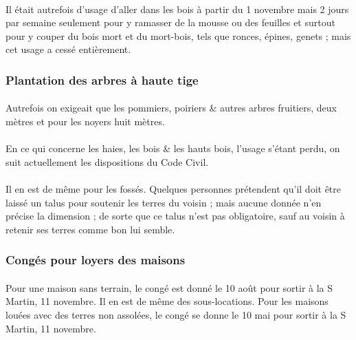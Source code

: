 \documentclass[../eBook.tex]{subfiles}
\begin{document}
      \paragraph{}Il était autrefois d'usage d'aller dans les bois à partir du 1 novembre mais 2 jours par semaine seulement pour y ramasser de la mousse ou des feuilles et surtout pour y couper du bois mort et du mort-bois, tels que ronces, épines, genets ; mais cet usage a cessé entièrement.

    \subsubsection*{Plantation des arbres à haute tige}
      \paragraph{}Autrefois on exigeait que les pommiers, poiriers \& autres arbres fruitiers, deux mètres et pour les noyers huit mètres.
      \paragraph{}En ce qui concerne les haies, les bois \& les hauts bois, l'usage s'étant perdu, on suit actuellement les dispositions du Code Civil.
      \paragraph{}Il en est de même pour les fossés. Quelques personnes prétendent qu'il doit être laissé un talus pour soutenir les terres du voisin ; mais aucune donnée n'en précise la dimension ; de sorte que ce talus n'est pas obligatoire, sauf au voisin à retenir ses terres comme bon lui semble.

    \subsubsection*{Congés pour loyers des maisons}
      \paragraph{}Pour une maison sans terrain, le congé est donné le 10 août pour sortir à la S Martin, 11 novembre. Il en est de même des sous-locations. Pour les maisons louées avec des terres non assolées, le congé se donne le 10 mai pour sortir à la S Martin, 11 novembre.
\end{document}
